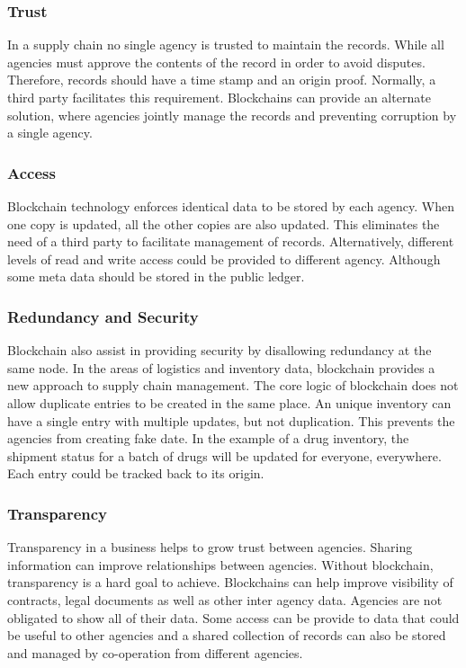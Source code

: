 \documentclass[sigconf]{acmart}
\begin{document}
\subsubsection{Trust}
In a supply chain no single agency is trusted to maintain the records. While all agencies must approve the contents of the record in order to avoid disputes. Therefore, records should have a time stamp and an origin proof. Normally, a third party facilitates this requirement. Blockchains can provide an alternate solution, where agencies jointly manage the records and preventing corruption by a single agency\cite{arbc1}. 

\subsubsection{Access}
Blockchain technology enforces identical data to be stored by each agency. When one copy is updated, all the other copies are also updated. This eliminates the need of a third party to facilitate management of records\cite{arbc3}. Alternatively, different levels of read and write access could be provided to different agency. Although some meta data should be stored in the public ledger. 

\subsubsection{Redundancy and Security}
Blockchain also assist in providing security by disallowing redundancy at the same node. In the areas of logistics and inventory data, blockchain provides a new approach to supply chain management. The core logic of blockchain does not allow duplicate entries to be created in the same place\cite{arbc4}. An unique inventory can have a single entry with multiple updates, but not duplication. This prevents the agencies from creating fake date. In the example of a drug inventory, the shipment status for a batch of drugs will be updated for everyone, everywhere. Each entry could be tracked back to its origin\cite{arbc4}. 

\subsubsection{Transparency}
Transparency in a business helps to grow trust between agencies. Sharing information can improve relationships between agencies. Without blockchain, transparency is a hard goal to achieve. Blockchains can help improve visibility of contracts, legal documents as well as other inter agency data\cite{pabc1}. Agencies are not obligated to show all of their data. Some access can be provide to data that could be useful to other agencies and a shared collection of records can also be stored and managed by co-operation from different agencies.
\end{document}
